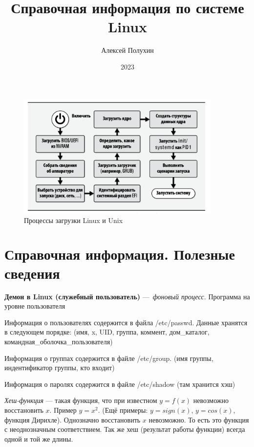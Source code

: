 \documentclass[oneside, final, 14pt]{extreport} %
\title{Справочная информация по системе Linux}
\author{Алексей Полухин}
\date{2023}
\begin{document}
\begin{titlepage}
    \maketitle
\end{titlepage}

\tableofcontents %
\newpage


\begin{figure}[ht]
    \centering
    \includegraphics[width=0.9\textwidth]{1.png}
    \caption{Процессы загрузки Linux и Unix}
    \label{fig:1}
\end{figure}

\section{Справочная информация. Полезные сведения}





\textbf{Демон в Linux (служебный пользователь)} --- \textit{фоновый процесс}. Программа на уровне пользователя

Информация о пользователях содержится в файла /etc/passwd. Данные хранятся в следующем порядке: (имя, x, UID, группа, коммент, дом\_каталог, командная\_оболочка\_пользователя)

Информация о группах содержится в файле /etc/group. (имя группы, индентификатор группы, кто входит)

Информация о паролях содержится в файле /etc/shadow (там хранится хэш)

\textit{Хеш-функция} --- такая функция, что при известном $ y = f(x) $ невозможно восстановить $x$.
Пример $ y = x^{2}$. (Ещё примеры: $y = sign(x)$, $y = cos(x)$, функция Дирихле). Однозначно восстановить $x $ невозможно. То есть это функция с неоднозначным соответствием.
Так же хеш (результат работы функции) всегда одной и той же длины.
\end{document}

